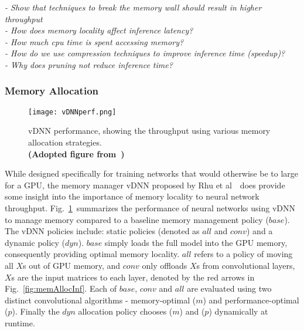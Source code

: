 \documentclass[../../D1.tex]{subfiles}
\begin{document}
\emph{
- Show that techniques to break the memory wall should result in higher throughput\\
- How does memory locality affect inference latency?\\
- How much cpu time is spent accessing memory?\\
- How do we use compression techniques to improve inference time (speedup)?\\
- Why does pruning not reduce inference time?
}


\subsubsection{Memory Allocation}\label{sec:MemAlloc}
\begin{figure}[H]
    \texttt{[image: vDNNperf.png]} 
    \caption{vDNN performance, showing the throughput using various memory allocation strategies. \\ \textbf{(Adopted figure from~\autocite{rhuVDNNVirtualizedDeep2016})}}
    \label{fig:vDNNperf}   
\end{figure}

While designed specifically for training networks that would otherwise be to large for a GPU, the memory manager vDNN proposed by Rhu et al~\autocite{rhuVDNNVirtualizedDeep2016}~does provide some insight into the importance of memory locality to neural network throughput.
Fig.~\ref{fig:vDNNperf}~summarizes the performance of neural networks using vDNN to manage memory compared to a baseline memory management policy ($base$). The vDNN policies include: static policies (denoted as $all$ and $conv$) and a dynamic policy ($dyn$).
$base$ simply loads the full model into the GPU memory, consequently providing optimal memory locality. $all$ refers to a policy of moving all $X$s out of GPU memory, and $conv$ only offloads $X$s from convolutional layers, $X$s are the input matrices to each layer, denoted by the red arrows in Fig.~\ref{fig:memAllocInf}.
Each of $base$, $conv$ and $all$ are evaluated using two distinct convolutional algorithms - memory-optimal ($m$) and performance-optimal ($p$).
Finally the $dyn$ allocation policy chooses ($m$) and ($p$) dynamically at runtime.
\end{document}
